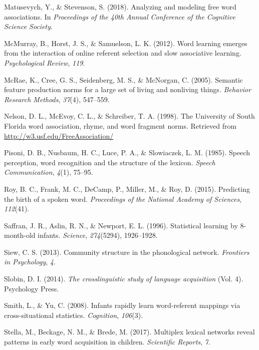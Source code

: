 \documentclass[english,,man,floatsintext]{apa6}
\begin{document}
\leavevmode\hypertarget{ref-matusevych2018}{}%
Matusevych, Y., \& Stevenson, S. (2018). Analyzing and modeling free word associations. In \emph{Proceedings of the 40th Annual Conference of the Cognitive Science Society}.

\leavevmode\hypertarget{ref-mcmurray2012}{}%
McMurray, B., Horst, J. S., \& Samuelson, L. K. (2012). Word learning emerges from the interaction of online referent selection and slow associative learning. \emph{Psychological Review}, \emph{119}.

\leavevmode\hypertarget{ref-mcrae2005}{}%
McRae, K., Cree, G. S., Seidenberg, M. S., \& McNorgan, C. (2005). Semantic feature production norms for a large set of living and nonliving things. \emph{Behavior Research Methods}, \emph{37}(4), 547--559.

\leavevmode\hypertarget{ref-nelson1998}{}%
Nelson, D. L., McEvoy, C. L., \& Schreiber, T. A. (1998). The University of South Florida word association, rhyme, and word fragment norms. Retrieved from \url{http://w3.usf.edu/FreeAssociation/}

\leavevmode\hypertarget{ref-pisoni1985}{}%
Pisoni, D. B., Nusbaum, H. C., Luce, P. A., \& Slowiaczek, L. M. (1985). Speech perception, word recognition and the structure of the lexicon. \emph{Speech Communication}, \emph{4}(1), 75--95.

\leavevmode\hypertarget{ref-roy2015}{}%
Roy, B. C., Frank, M. C., DeCamp, P., Miller, M., \& Roy, D. (2015). Predicting the birth of a spoken word. \emph{Proceedings of the National Academy of Sciences}, \emph{112}(41).

\leavevmode\hypertarget{ref-saffran1996}{}%
Saffran, J. R., Aslin, R. N., \& Newport, E. L. (1996). Statistical learning by 8-month-old infants. \emph{Science}, \emph{274}(5294), 1926--1928.

\leavevmode\hypertarget{ref-siew2013}{}%
Siew, C. S. (2013). Community structure in the phonological network. \emph{Frontiers in Psychology}, \emph{4}.

\leavevmode\hypertarget{ref-slobin2014}{}%
Slobin, D. I. (2014). \emph{The crosslinguistic study of language acquisition} (Vol. 4). Psychology Press.

\leavevmode\hypertarget{ref-smith2008}{}%
Smith, L., \& Yu, C. (2008). Infants rapidly learn word-referent mappings via cross-situational statistics. \emph{Cognition}, \emph{106}(3).

\leavevmode\hypertarget{ref-stella2017}{}%
Stella, M., Beckage, N. M., \& Brede, M. (2017). Multiplex lexical networks reveal patterns in early word acquisition in children. \emph{Scientific Reports}, \emph{7}.
\end{document}
